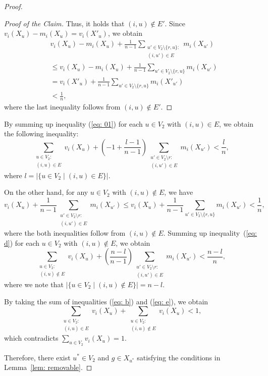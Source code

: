 \documentclass[11pt]{article}
\begin{document}
\begin{proof}
\begin{proof}[Proof of the Claim]
Thus, it holds that $(i, u) \not\in E'$.
Since $v_i(X_u)-m_i(X_u) = v_i(X'_u)$, we obtain 
\begin{align*}
&v_i(X_u)-m_i(X_u)+\frac{1}{n-1}\sum_{\substack{u'\in V_2\setminus \{r, u\}:\\(i, u')\in E}} m_i(X_{u'})  \\
&\le v_i(X_u)-m_i(X_u)+\frac{1}{n-1}\sum_{u'\in V_2\setminus \{r, u\}} m_i(X_{u'}) \\
&= v_i(X'_u)+\frac{1}{n-1}\sum_{u'\in V_2\setminus \{r, u\}} m_i(X'_{u'}) \\
&< \frac{1}{n}, 
\end{align*}
where the last inequality follows from $(i, u) \not\in E'$.  
\end{proof}
By summing up inequality (\ref{eq: 01}) for each $u\in V_2$ with $(i,u)\in E$, we obtain the following inequality: 
\begin{equation}\label{eq: b}
\sum_{\substack{u\in V_2:\\ (i,u)\in E}} v_i(X_{u})+\left(- 1 + \frac{l-1}{n-1}\right)\sum_{\substack{u'\in V_2\setminus r: \\ (i, u') \in E}} m_i(X_{u'}) < \frac{l}{n},
\end{equation}
where $l=|\{u\in V_2\mid (i, u)\in E\}|$. 

On the other hand, for any $u\in V_2$ with $(i,u)\not\in E$, we have 
\begin{equation}\label{eq: d}
v_i(X_{u})+\frac{1}{n-1}\sum_{\substack{u'\in V_2\setminus r: \\ (i,u')\in E}} m_i(X_{u'}) \le 
v_i(X_{u})+\frac{1}{n-1}\sum_{u'\in V_2\setminus \{r, u\}} m_i(X_{u'}) < \frac{1}{n}, 
\end{equation}
where the both inequalities follow from $(i,u)\not\in E$.
Summing up inequality~(\ref{eq: d}) for each $u\in V_2$ with $(i,u)\not\in E$, we obtain 
\begin{equation}\label{eq: e}
\sum_{\substack{u\in V_2:\\ (i,u)\not\in E}} v_i(X_u)+\left(\frac{n-l}{n-1}\right)\sum_{\substack{u'\in V_2\setminus r: \\ (i,u') \in E}} m_i(X_{u'}) < \frac{n-l}{n}, 
\end{equation}
where we note that $|\{u\in V_2\mid (i, u) \not\in E\}| = n-l$. 

By taking the sum of inequalities (\ref{eq: b}) and (\ref{eq: e}), we obtain 
$$
\sum_{\substack{u\in V_2:\\ (i,u)\in E}} v_i(X_{u})+ \sum_{\substack{u\in V_2:\\ (i,u)\not\in E}} v_i(X_{u}) < 1, 
$$
which contradicts $\sum_{u\in V_2} v_i(X_{u}) = 1$. 

Therefore, there exist $u^*\in V_2$ and $g\in X_{u^*}$ satisfying the conditions in Lemma~\ref{lem: removable}.
\end{proof}
\end{document}
